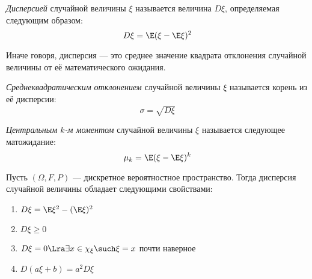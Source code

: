 \begin{definition}
	\textit{Дисперсией} случайной величины $\xi$ называется величина $D\xi$, определяемая следующим образом:
	\[
		D\xi = \E(\xi - \E\xi)^2
	\]
\end{definition}

\begin{note}
	Иначе говоря, дисперсия --- это среднее значение квадрата отклонения случайной величины от её математического ожидания.
\end{note}

\begin{definition}
	\textit{Среднеквадратическим отклонением} случайной величины $\xi$ называется корень из её дисперсии:
	\[
		\sigma = \sqrt{D\xi}
	\]
\end{definition}

\begin{definition}
	\textit{Центральным $k$-м моментом} случайной величины $\xi$ называется следующее матожидание:
	\[
		\mu_k = \E(\xi - \E\xi)^k
	\]
\end{definition}

\begin{theorem}
	Пусть $(\Omega, F, P)$ --- дискретное вероятностное пространство. Тогда дисперсия случайной величины обладает следующими свойствами:
	\begin{enumerate}
		\item \(D\xi = \E\xi^2 - (\E\xi)^2\)
		
		\item \(D\xi \ge 0\)
		
		\item $D\xi = 0 \Lra \exists x \in \chi_\xi \such \xi = x$ почти наверное
		
		\item $D(a\xi + b) = a^2D\xi$
	\end{enumerate}
\end{theorem}

